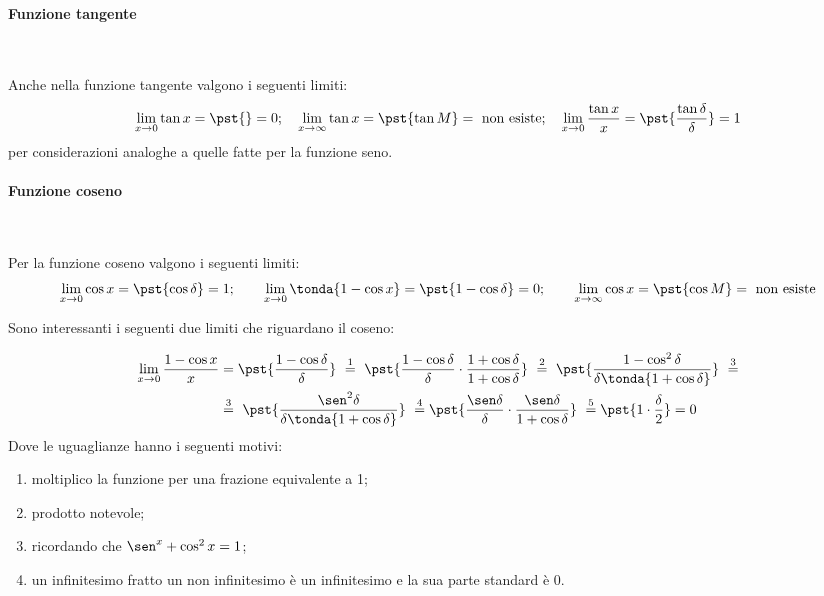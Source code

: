 \paragraph{Funzione tangente}~

Anche nella funzione tangente valgono i seguenti limiti:
\[\lim_{x \rightarrow 0}{\tan x} = \pst{} = 0; \quad
\lim_{x \rightarrow \infty}{\tan x} = \pst{\tan M} = 
                                      \text{ non esiste}; \quad
\lim_{x \rightarrow 0}\frac{\tan x}{x} = \pst{\frac{\tan \delta}{\delta}} 
                                       = 1\]
per considerazioni analoghe a quelle fatte per la funzione seno.

\paragraph{Funzione coseno}~

Per la funzione coseno valgono i seguenti limiti:
\[\lim_{x \rightarrow 0}{\cos x} = \pst{\cos \delta} = 1; \qquad
\lim_{x \rightarrow 0}\tonda{1-\cos x} = \pst{1-\cos \delta} = 0; \qquad
\lim_{x \rightarrow \infty}{\cos x} = \pst{\cos M} = \text{ non esiste}\]

Sono interessanti i seguenti due limiti che riguardano il coseno:

\begin{align*}
 \lim_{x \rightarrow 0} \frac{1-\cos x}{x} &=
 \pst{\frac{1-\cos \delta}{\delta}}
~ \stackrel{1}{=} ~  
 \pst{\frac{1-\cos \delta}{\delta} \cdot 
      \frac{1+\cos \delta}{1+\cos \delta}}
~ \stackrel{2}{=} ~ 
 \pst{\frac{1-\cos^2 \delta}{\delta \tonda{1+\cos \delta}}}~ 
\stackrel{3}{=} \\
& \stackrel{3}{=} ~
 \pst{\frac{\sen^2 \delta}{\delta \tonda{1+\cos \delta}}}
~ \stackrel{4}{=}
 \pst{\frac{\sen \delta}{\delta} \cdot 
      \frac{\sen \delta}{1+\cos \delta}}
~ \stackrel{5}{=}
 \pst{1 \cdot \frac{\delta}{2}} = 0
\end{align*}
Dove le uguaglianze hanno i seguenti motivi:
\begin{enumerate} [nosep]
 \item moltiplico la funzione per una frazione equivalente a 1;
 \item prodotto notevole;
 \item ricordando che \(\sen^x + \cos^2 x = 1\);
 \item un infinitesimo fratto un non infinitesimo è un infinitesimo 
e la sua parte standard è 0.
\end{enumerate}

